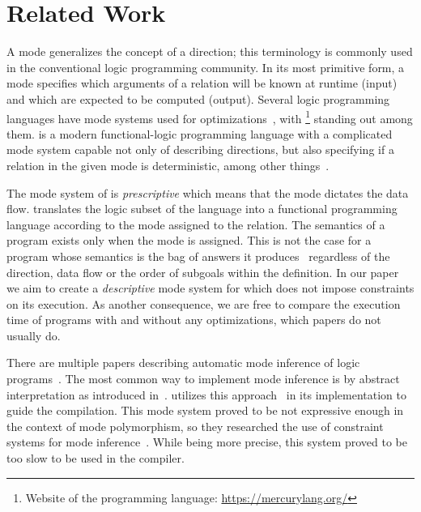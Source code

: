 \section{Related Work}
\label{sec:related}

A mode generalizes the concept of a direction; this terminology is commonly used in the conventional logic programming community.
In its most primitive form, a mode specifies which arguments of a relation will be known at runtime (input) and which are expected to be computed (output).
Several logic programming languages have mode systems used for optimizations~\cite{warren1977implementing, van1992high, thom1986nu}, with \merc\footnote{Website of the \merc programming language: \url{https://mercurylang.org/}} standing out among them.
\merc is a modern functional-logic programming language with a complicated mode system capable not only of describing directions, but also specifying if a relation in the given mode is deterministic, among other things~\cite{somogyi1987system,overton2002constraint}.

The mode system of \merc is \emph{prescriptive} which means that the mode dictates the data flow.
\merc translates the logic subset of the language into a functional programming language according to the mode assigned to the relation.
The semantics of a \merc program exists only when the mode is assigned.
This is not the case for a \mk program whose semantics is the bag of answers it produces~\cite{rozplokhas2020certified} regardless of the direction, data flow or the order of subgoals within the definition.
In our paper we aim to create a \emph{descriptive} mode system for \mk which does not impose constraints on its execution.
As another consequence, we are free to compare the execution time of programs with and without any optimizations, which \merc papers do not usually do.

There are multiple papers describing automatic mode inference of logic programs~\cite{debray1988automatic, ridoux1999typed, smaus2000mode}.
The most common way to implement mode inference is by abstract interpretation as introduced in~\cite{janssens1992deriving}.
\merc utilizes this approach~\cite{somogyi1987system} in its implementation to guide the compilation.
This mode system proved to be not expressive enough in the context of mode polymorphism, so they researched the use of constraint systems for mode inference~\cite{overton2002constraint}.
While being more precise, this system proved to be too slow to be used in the compiler.

